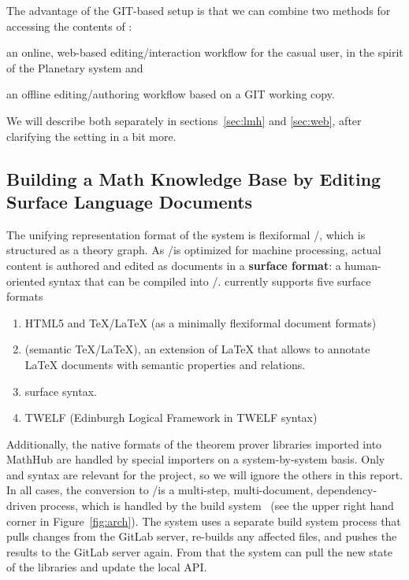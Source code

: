 The advantage of the GIT-based setup is that we can combine two methods for accessing the
contents of \sys:
\begin{compactenum}[\em i\rm)]
\item an online, web-based editing/interaction workflow for the casual user, in the spirit
  of the Planetary system and
\item an offline editing/authoring workflow based on a GIT working copy.
\end{compactenum}
We will describe both separately in sections~\ref{sec:lmh} and \ref{sec:web}, after
clarifying the setting in \sys a bit more.

\subsection{Building a Math Knowledge Base by Editing Surface Language
  Documents}\label{sec:surface}

The unifying representation format of the \sys system is flexiformal \omdoc/\mmt, which is
structured as a theory graph. As \omdoc/\mmt is optimized for machine processing, actual
content is authored and edited as documents in a \textbf{surface format}: a human-oriented
syntax that can be compiled into \omdoc/\mmt. \sys currently supports five surface formats 
\begin{enumerate}
\item HTML5 and {\TeX/\LaTeX} (as a minimally flexiformal document formats)
\item \sTeX (semantic {\TeX/\LaTeX}), an extension of {\LaTeX} that allows to annotate
  {\LaTeX} documents with semantic properties and relations.
\item \mmt surface syntax.
\item TWELF (Edinburgh Logical Framework in TWELF syntax)
\end{enumerate}
Additionally, the native formats of the theorem prover libraries imported into MathHub are
handled by special importers on a system-by-system basis. Only \sTeX and \mmt syntax are
relevant for the \pn project, so we will ignore the others in this report. In all cases,
the conversion to \omdoc/\mmt is a multi-step, multi-document, dependency-driven process,
which is handled by the \mmt build system~\cite{mmt:buildsys:on} (see the upper right hand
corner in Figure~\ref{fig:arch}). The \sys system uses a separate build system process
that pulls changes from the \sys GitLab server, re-builds any affected files, and pushes
the results to the \sys GitLab server again. From that the \sys system can pull the new
state of the libraries and update the local \mmt API.

